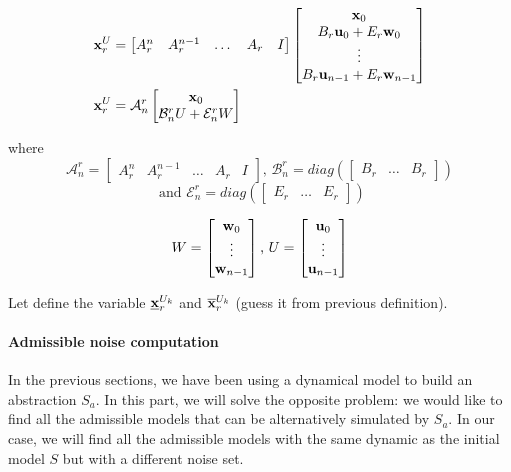 \newcommand{\An}{\mathcal{A}^r_n}
\newcommand{\Bn}{\mathcal{B}^r_n}
\newcommand{\En}{\mathcal{E}^r_n}
\begin{align} \label{expr:xur}
\xu &=
\begin{bmatrix}
A_r^n & A_r^{n-1} &\dots & A_r & I
\end{bmatrix}
\begin{bmatrix}
\x_0 \\
B_r \u_0 + E_r \w_0\\
\vdots \\
B_r \u_{n-1} + E_r \w_{n-1}\\
\end{bmatrix}\\
\xu &=
\An
\begin{bmatrix}
\x_0 \\
\Bn U + \En W
\end{bmatrix}
\end{align}

where
$$
\An = 
\begin{bmatrix}
A_r^n & A_r^{n-1} &\dots & A_r & I
\end{bmatrix}
\textrm{, }
\Bn =
diag( 
\begin{bmatrix}
B_r &
\dots &
B_r
\end{bmatrix})
$$
$$\textrm{ and }
\En = 
diag(\begin{bmatrix}
E_r &
\dots &
E_r
\end{bmatrix} )
$$

$$
W = \begin{bmatrix}
 \mathbf{w}_0\\
\vdots\\
 \mathbf{w}_{n-1}
\end{bmatrix}
\textrm{, }
U = \begin{bmatrix}
 \mathbf{u}_0\\
\vdots\\
 \mathbf{u}_{n-1}
\end{bmatrix}
$$

\newcommand{\xuki}{\minf{\x}^{U_k}_r}
\newcommand{\xuks}{\msup{\x}^{U_k}_r}
\newcommand{\xuk}{\x^{U_k}_r}
Let define the variable $\xuki$ and $\xuks$ (guess it from previous definition).

\paragraph{Admissible noise computation}
In the previous sections, we have been using a dynamical model to build an abstraction $S_a$. In this part, we will solve the opposite problem:  we would like to find all the admissible models that can be alternatively simulated by $S_a$.
In our case, we will find all the admissible models with the same dynamic as the initial model $S$ but with a different noise set.

